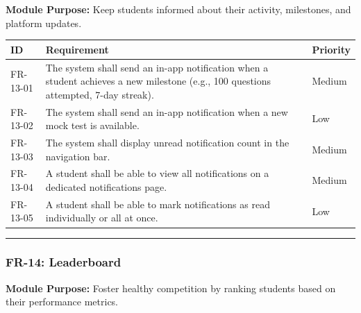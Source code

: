 \documentclass[
]{article}
\begin{document}
\textbf{Module Purpose:} Keep students informed about their activity,
milestones, and platform updates.

\begin{longtable}[]{@{}
  >{\raggedright\arraybackslash}p{}
  >{\raggedright\arraybackslash}p{}
  >{\raggedright\arraybackslash}p{}@{}}
\toprule\noalign{}
\begin{minipage}[b]{\linewidth}\raggedright
ID
\end{minipage} & \begin{minipage}[b]{\linewidth}\raggedright
Requirement
\end{minipage} & \begin{minipage}[b]{\linewidth}\raggedright
Priority
\end{minipage} \\
\midrule\noalign{}
\endhead
\bottomrule\noalign{}
\endlastfoot
FR-13-01 & The system shall send an in-app notification when a student
achieves a new milestone (e.g., 100 questions attempted, 7-day streak).
& Medium \\
FR-13-02 & The system shall send an in-app notification when a new mock
test is available. & Low \\
FR-13-03 & The system shall display unread notification count in the
navigation bar. & Medium \\
FR-13-04 & A student shall be able to view all notifications on a
dedicated notifications page. & Medium \\
FR-13-05 & A student shall be able to mark notifications as read
individually or all at once. & Low \\
\end{longtable}

\begin{center}\rule{0.5\linewidth}{0.5pt}\end{center}

\subsubsection{FR-14: Leaderboard}\label{fr-14-leaderboard}

\textbf{Module Purpose:} Foster healthy competition by ranking students
based on their performance metrics.
\end{document}

